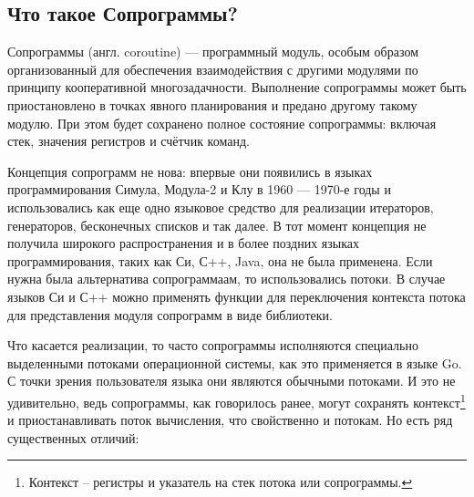 	\subsection{Что такое Сопрограммы?}
	Сопрограммы (англ. coroutine) — программный модуль, особым образом организованный для обеспечения взаимодействия с другими модулями по принципу кооперативной многозадачности\cite{coroutine}. Выполнение сопрограммы может быть
	приостановлено в точках явного планирования и предано другому такому модулю. При этом будет сохранено полное
	состояние сопрограммы: включая стек, значения регистров и счётчик команд.
	\par
	Концепция сопрограмм не нова: впервые они появились в языках программирования Симула\cite{simula},
	Модула-2\cite{modula} и Клу\cite{clu} в 1960 — 1970-е годы и использовались как еще одно языковое средство для
	реализации итераторов, генераторов, бесконечных списков и так далее. В
	тот момент концепция не получила широкого распространения и в более поздних языках
	программирования, таких как Си, С++, Java, она не была применена. Если нужна была
	альтернатива сопрограммаам, то использовались потоки. В случае языков Си и С++ можно применять функции для
	переключения контекста потока для представления модуля сопрограмм в виде библиотеки.
	\par
	Что касается реализации, то часто сопрограммы исполняются специально выделенными потоками операционной системы,
	как это применяется в языке Go. С точки зрения пользователя языка они являются обычными потоками.
	И это не удивительно, ведь сопрограммы, как говорилось ранее, могут сохранять контекст\footnote{Контекст -- регистры и указатель на стек потока или сопрограммы.} и приостанавливать поток вычисления, что свойственно и потокам. Но есть ряд существенных отличий:
